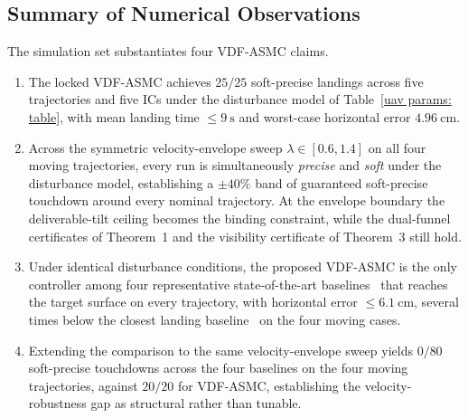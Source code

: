 \documentclass{IEEEtaes}
\begin{document}
\subsection{Summary of Numerical Observations}
\label{summary: subsec}
The simulation set substantiates four VDF-ASMC claims.
\begin{enumerate}
    \item The locked VDF-ASMC achieves $25/25$ soft-precise landings across five trajectories and five ICs under the disturbance model of Table~\ref{uav params: table}, with mean landing time $\le 9~\text{s}$ and worst-case horizontal error $4.96~\text{cm}$.
    \item Across the symmetric velocity-envelope sweep $\lambda\in[0.6,1.4]$ on all four moving trajectories, every run is simultaneously \emph{precise} and \emph{soft} under the disturbance model, establishing a $\pm 40\%$ band of guaranteed soft-precise touchdown around every nominal trajectory. At the envelope boundary the deliverable-tilt ceiling becomes the binding constraint, while the dual-funnel certificates of Theorem~1 and the visibility certificate of Theorem~3 still hold.
    \item Under identical disturbance conditions, the proposed VDF-ASMC is the only controller among four representative state-of-the-art baselines~\cite{lin2022,zhang2026,lin2023,cho2022} that reaches the target surface on every trajectory, with horizontal error $\le 6.1~\text{cm}$, several times below the closest landing baseline~\cite{zhang2026} on the four moving cases.
    \item Extending the comparison to the same velocity-envelope sweep yields $0/80$ soft-precise touchdowns across the four baselines on the four moving trajectories, against $20/20$ for VDF-ASMC, establishing the velocity-robustness gap as structural rather than tunable.
\end{enumerate}




\end{document}
